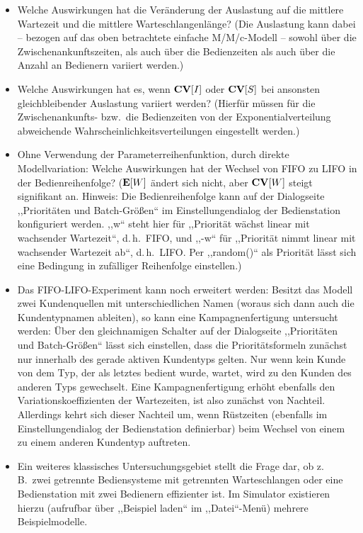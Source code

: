 \documentclass[deutsch]{svmono}
\begin{document}
\begin{itemize}
\item
Welche Auswirkungen hat die Veränderung der Auslastung auf die mittlere Wartezeit und die mittlere Warteschlangenlänge? (Die Auslastung kann dabei -- bezogen auf das oben betrachtete einfache M/M/c-Modell -- sowohl über die Zwischenankunftszeiten, als auch über die Bedienzeiten als auch über die Anzahl an Bedienern variiert werden.)
\item
Welche Auswirkungen hat es, wenn ${\bf CV}[I]$ oder ${\bf CV}[S]$ bei ansonsten gleichbleibender Auslastung variiert werden? (Hierfür müssen für die Zwischenankunfts- bzw.\ die Bedienzeiten von der Exponentialverteilung abweichende Wahrscheinlichkeitsverteilungen eingestellt werden.)
\item
Ohne Verwendung der Parameterreihenfunktion, durch direkte Modellvariation: Welche Auswirkungen hat der Wechsel von FIFO zu LIFO in der Bedienreihenfolge? (${\bf E}[W]$ ändert sich nicht, aber ${\bf CV}[W]$ steigt signifikant an. Hinweis: Die Bedienreihenfolge kann auf der Dialogseite ,,Prioritäten und Batch-Größen`` im Einstellungendialog der Bedienstation konfiguriert werden. ,,w`` steht hier für ,,Priorität wächst linear mit wachsender Wartezeit``, d.\,h.\ FIFO, und ,,-w`` für ,,Priorität nimmt linear mit wachsender Wartezeit ab``, d.\,h.\ LIFO. Per ,,random()`` als Priorität lässt sich eine Bedingung in zufälliger Reihenfolge einstellen.)
\item
Das FIFO-LIFO-Experiment kann noch erweitert werden: Besitzt das Modell zwei Kundenquellen mit unterschiedlichen Namen (woraus sich dann auch die Kundentypnamen ableiten), so kann eine Kampagnenfertigung untersucht werden: Über den gleichnamigen Schalter auf der Dialogseite ,,Prioritäten und Batch-Größen`` lässt sich einstellen, dass die Prioritätsformeln zunächst nur innerhalb des gerade aktiven Kundentyps gelten. Nur wenn kein Kunde von dem Typ, der als letztes bedient wurde, wartet, wird zu den Kunden des anderen Typs gewechselt. Eine Kampagnenfertigung erhöht ebenfalls den Variationskoeffizienten der Wartezeiten, ist also zunächst von Nachteil. Allerdings kehrt sich dieser Nachteil um, wenn Rüstzeiten (ebenfalls im Einstellungendialog der Bedienstation definierbar) beim Wechsel von einem zu einem anderen Kundentyp auftreten.
\item
Ein weiteres klassisches Untersuchungsgebiet stellt die Frage dar, ob z.\,B.\ zwei getrennte Bediensysteme mit getrennten Warteschlangen oder eine Bedienstation mit zwei Bedienern effizienter ist. Im Simulator existieren hierzu (aufrufbar über ,,Beispiel laden`` im ,,Datei``-Menü) mehrere Beispielmodelle.
\end{itemize}
\end{document}
